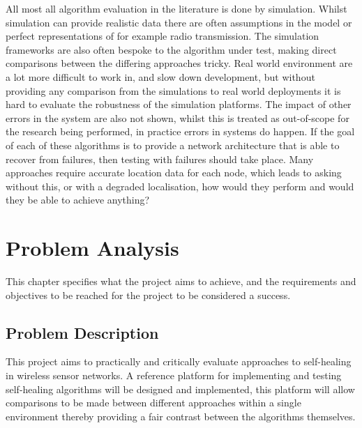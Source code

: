 \documentclass[authoryearcitations]{UoYCSproject}
\begin{document}

All most all algorithm evaluation in the literature is done by simulation. Whilst simulation can provide realistic data there are often assumptions in the model or perfect representations of for example radio transmission. The simulation frameworks are also often bespoke to the algorithm under test, making direct comparisons between the differing approaches tricky. Real world environment are a lot more difficult to work in, and slow down development, but without providing any comparison from the simulations to real world deployments it is hard to evaluate the robustness of the simulation platforms. The impact of other errors in the system are also not shown, whilst this is treated as out-of-scope for the research being performed, in practice errors in systems do happen. If the goal of each of these algorithms is to provide a network architecture that is able to recover from failures, then testing with failures should take place. Many approaches require accurate location data for each node, which leads to asking without this, or with a degraded localisation, how would they perform and would they be able to achieve anything?




\chapter{Problem Analysis}
\label{cha:Problem}

This chapter specifies what the project aims to achieve, and the requirements and objectives to be reached for the project to be considered a success.

\section{Problem Description}
This project aims to practically and critically evaluate approaches to self-healing in wireless sensor networks. A reference platform for implementing and testing self-healing algorithms will be designed and implemented, this platform will allow comparisons to be made between different approaches within a single environment thereby providing a fair contrast between the algorithms themselves.
\end{document}

